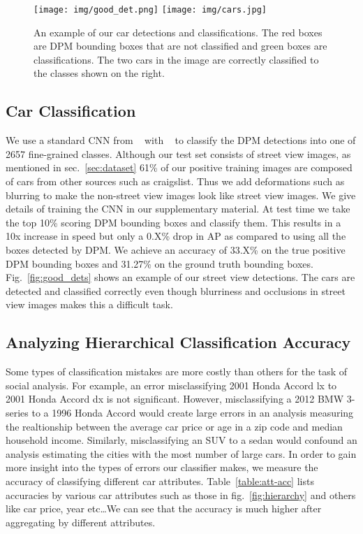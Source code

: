 \documentclass[10pt,twocolumn,letterpaper]{article}
\begin{document}
\begin{figure} [t]
\begin{center}
\texttt{[image: img/good\_det.png]}
\raisebox{-0.02\height}
 {
\texttt{[image: img/cars.jpg]}
 }
\end{center}
\caption {An example of our car detections and classifications. The red boxes are DPM bounding boxes that are not classified and green boxes are classifications. The two cars in the image are correctly classified to the classes shown on the right.}
\label{fig:dets}
\end{figure}

\subsection{Car Classification}
We use a standard CNN from ~\cite{alexnet} with ~\cite{caffe} to classify the DPM detections into one of 2657 fine-grained classes. Although our test set consists of street view images, as mentioned in sec.~\ref{sec:dataset} 61\% of our positive training images are composed of cars from other sources such as craigslist. Thus we add deformations such as blurring to make the non-street view images look like street view images. We give details of training the CNN in our supplementary material. At test time we take the top 10\% scoring DPM bounding boxes and classify them. This results in a 10x increase in speed but only a 0.X\% drop in AP as compared to using all the boxes detected by DPM. We achieve an accuracy of 33.X\% on the true positive DPM bounding boxes and 31.27\% on the ground truth bounding boxes. Fig.~\ref{fig:good_dets} shows an example of our street view detections. The cars are detected and classified correctly even though blurriness and occlusions in street view images makes this a difficult task.

\subsection{Analyzing Hierarchical Classification Accuracy}
Some types of classification mistakes are more costly than others for the task of social analysis. For example, an error misclassifying 2001 Honda Accord lx to 2001 Honda Accord dx is not significant. However, misclassifying a 2012 BMW 3-series to a 1996 Honda Accord would create large errors in an analysis measuring the realtionship between the average car price or age in a zip code and median household income. Similarly, misclassifying an SUV to a sedan would confound an analysis estimating the cities with the most number of large cars. In order to gain more insight into the types of errors our classifier makes, we measure the accuracy of classifying different car attributes. Table~\ref{table:att-acc} lists accuracies by various car attributes such as those in fig.~\ref{fig:hierarchy} and others like car price, year etc\ldots We can see that the accuracy is much higher after aggregating by different attributes.  
\end{document}
